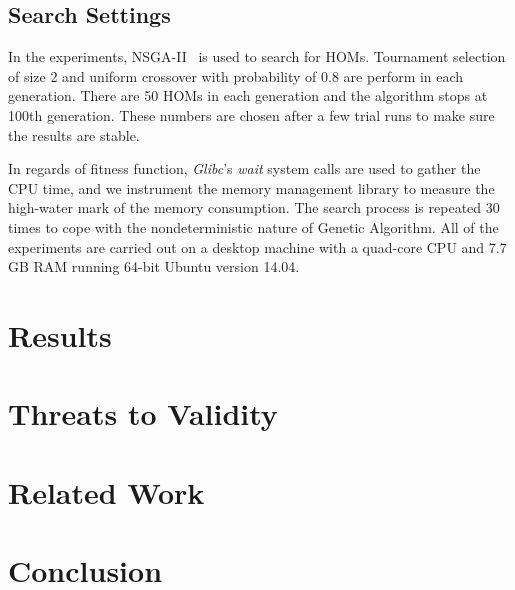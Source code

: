 \documentclass[oribibl]{llncs}
\begin{document}
\subsection{Search Settings}
\label{sec_searchsetting}

In the experiments, NSGA-II~\cite{996017} is used to search for HOMs.
Tournament selection of size 2 and uniform crossover with probability of 0.8 are perform in each generation.
There are 50 HOMs in each generation and the algorithm stops at 100th generation.
These numbers are chosen after a few trial runs to make sure the results are stable.

In regards of fitness function, \emph{Glibc}'s \emph{wait} system calls are used to gather the CPU time, and we instrument the memory management library to measure the high-water mark of the memory consumption.
The search process is repeated 30 times to cope with the nondeterministic nature of Genetic Algorithm.
All of the experiments are carried out on a desktop machine with a quad-core CPU and 7.7 GB RAM running 64-bit Ubuntu version 14.04.

\section{Results}
\label{sec_result}

\section{Threats to Validity}
\label{sec_threat}

\section{Related Work}
\label{sec_related}

\section{Conclusion}
\label{sec_conclusion}


   
\end{document}
